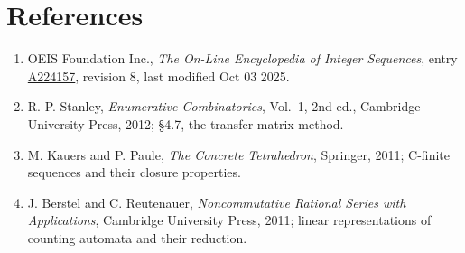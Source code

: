 \documentclass[11pt]{article}
\theoremstyle{definition}
\begin{document}
\section{References}

\begin{enumerate}

\item OEIS Foundation Inc., \emph{The On-Line Encyclopedia of Integer Sequences}, entry \href{https://oeis.org/A224157}{A224157}, revision 8, last modified Oct 03 2025.

\item R. P. Stanley, \emph{Enumerative Combinatorics}, Vol.~1, 2nd ed., Cambridge University Press, 2012; \S4.7, the transfer-matrix method.

\item M. Kauers and P. Paule, \emph{The Concrete Tetrahedron}, Springer, 2011; C-finite sequences and their closure properties.

\item J. Berstel and C. Reutenauer, \emph{Noncommutative Rational Series with Applications}, Cambridge University Press, 2011; linear representations of counting automata and their reduction.

\end{enumerate}
\end{document}

